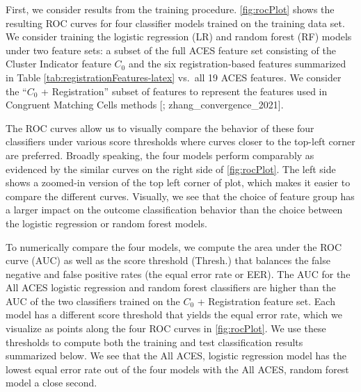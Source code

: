 \documentclass[11pt,]{isuthesis}
\begin{document}
First, we consider results from the training procedure.
\ref{fig:rocPlot} shows the resulting ROC curves for four classifier models trained on the training data set.
We consider training the logistic regression (LR) and random forest (RF) models under two feature sets: a subset of the full ACES feature set consisting of the Cluster Indicator feature \(C_0\) and the six registration-based features summarized in Table \ref{tab:registrationFeatures-latex} vs.~all 19 ACES features.
We consider the ``\(C_0\) + Registration'' subset of features to represent the features used in Congruent Matching Cells methods {[}\citet{song_proposed_2013}; zhang\_convergence\_2021{]}.

The ROC curves allow us to visually compare the behavior of these four classifiers under various score thresholds where
curves closer to the top-left corner are preferred.
Broadly speaking, the four models perform comparably as evidenced by the similar curves on the right side of \ref{fig:rocPlot}.
The left side shows a zoomed-in version of the top left corner of plot, which makes it easier to compare the different curves.
Visually, we see that the choice of feature group has a larger impact on the outcome classification behavior than the choice between the logistic regression or random forest models.

To numerically compare the four models, we compute the area under the ROC curve (AUC) as well as the score threshold (Thresh.) that balances the false negative and false positive rates (the equal error rate or EER).
The AUC for the All ACES logistic regression and random forest classifiers are higher than the AUC of the two classifiers trained on the \(C_0\) + Registration feature set.
Each model has a different score threshold that yields the equal error rate, which we visualize as points along the four ROC curves in \ref{fig:rocPlot}.
We use these thresholds to compute both the training and test classification results summarized below.
We see that the All ACES, logistic regression model has the lowest equal error rate out of the four models with the All ACES, random forest model a close second.
\end{document}
